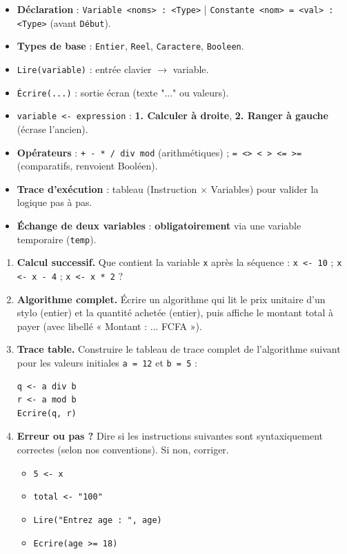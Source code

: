 \documentclass[11pt]{article}
\begin{document}
\begin{aretenir}
\begin{itemize}
\item \textbf{Déclaration} : \texttt{Variable <noms> : <Type>} | \texttt{Constante <nom> = <val> : <Type>} (avant \texttt{Début}).
\item \textbf{Types de base} : \texttt{Entier}, \texttt{Reel}, \texttt{Caractere}, \texttt{Booleen}.
\item \texttt{Lire(variable)} : entrée clavier $\rightarrow$ variable.
\item \texttt{Écrire(...)} : sortie écran (texte "..." ou valeurs).
\item \texttt{variable <- expression} : \textbf{1. Calculer à droite}, \textbf{2. Ranger à gauche} (écrase l'ancien).
\item \textbf{Opérateurs} : \texttt{+ - * / div mod} (arithmétiques) ; \texttt{= <> < > <= >=} (comparatifs, renvoient Booléen).
\item \textbf{Trace d'exécution} : tableau (Instruction $\times$ Variables) pour valider la logique pas à pas.
\item \textbf{Échange de deux variables} : \textbf{obligatoirement} via une variable temporaire (\texttt{temp}).
\end{itemize}
\end{aretenir}

\begin{exercice}
\begin{enumerate}
\item \textbf{Calcul successif.} Que contient la variable \texttt{x} après la séquence : \texttt{x <- 10} ; \texttt{x <- x - 4} ; \texttt{x <- x * 2} ?
\item \textbf{Algorithme complet.} Écrire un algorithme qui lit le prix unitaire d'un stylo (entier) et la quantité achetée (entier), puis affiche le montant total à payer (avec libellé « Montant : ... FCFA »).
\item \textbf{Trace table.} Construire le tableau de trace complet de l'algorithme suivant pour les valeurs initiales \texttt{a = 12} et \texttt{b = 5} :
\begin{lstlisting}
q <- a div b
r <- a mod b
Ecrire(q, r)
\end{lstlisting}
\item \textbf{Erreur ou pas ?} Dire si les instructions suivantes sont syntaxiquement correctes (selon nos conventions). Si non, corriger.
\begin{itemize}
\item \texttt{5 <- x}
\item \texttt{total <- "100"}
\item \texttt{Lire("Entrez age : ", age)}
\item \texttt{Ecrire(age >= 18)}
\end{itemize}
\end{enumerate}
\end{exercice}
\end{document}
